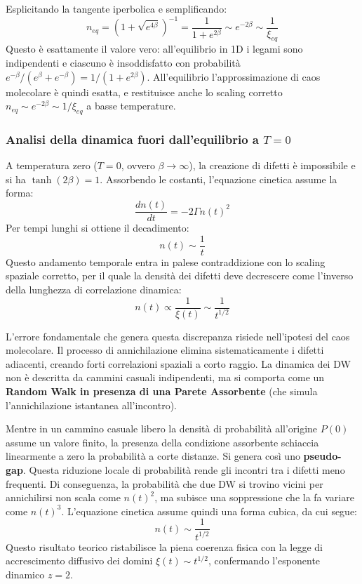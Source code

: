 Esplicitando la tangente iperbolica e semplificando:
\begin{equation}
    n_{eq} = \left( 1 + \sqrt{e^{4\beta}} \right)^{-1} = \frac{1}{1 + e^{2\beta}} \sim e^{-2\beta} \sim \frac{1}{\xi_{eq}}
\end{equation}
Questo è esattamente il valore vero: all'equilibrio in 1D i legami sono indipendenti e ciascuno è insoddisfatto con probabilità $e^{-\beta}/(e^{\beta}+e^{-\beta}) = 1/(1+e^{2\beta})$. All'equilibrio l'approssimazione di caos molecolare è quindi esatta, e restituisce anche lo scaling corretto $n_{eq} \sim e^{-2\beta} \sim 1/\xi_{eq}$ a basse temperature.

\subsubsection*{Analisi della dinamica fuori dall'equilibrio a $T=0$}
A temperatura zero ($T = 0$, ovvero $\beta \to \infty$), la creazione di difetti è impossibile e si ha $\tanh(2\beta) = 1$. 
Assorbendo le costanti, l'equazione cinetica assume la forma:
\begin{equation}
    \frac{dn(t)}{dt} = -2\Gamma n(t)^2
\end{equation}
Per tempi lunghi si ottiene il decadimento:
\begin{equation}
    n(t) \sim \frac{1}{t}
\end{equation}
Questo andamento temporale entra in palese contraddizione con lo scaling spaziale corretto, per il quale la densità dei difetti deve decrescere come l'inverso della lunghezza di correlazione dinamica:
\begin{equation}
    n(t) \propto \frac{1}{\xi(t)} \sim \frac{1}{t^{1/2}}
\end{equation}

\vspace{0.3cm}

\noindent L'errore fondamentale che genera questa discrepanza risiede nell'ipotesi del caos molecolare. Il processo di annichilazione elimina sistematicamente i difetti adiacenti, creando forti correlazioni spaziali a corto raggio. La dinamica dei DW non è descritta da cammini casuali indipendenti, ma si comporta come un \textbf{Random Walk in presenza di una Parete Assorbente} (che simula l'annichilazione istantanea all'incontro). 

Mentre in un cammino casuale libero la densità di probabilità all'origine $P(0)$ assume un valore finito, la presenza della condizione assorbente schiaccia linearmente a zero la probabilità a corte distanze. Si genera così uno \textbf{pseudo-gap}.
Questa riduzione locale di probabilità rende gli incontri tra i difetti meno frequenti. Di conseguenza, la probabilità che due DW si trovino vicini per annichilirsi non scala come $n(t)^2$, ma subisce una soppressione che la fa variare come $n(t)^3$.
L'equazione cinetica assume quindi una forma cubica, da cui segue:
\begin{equation}
     n(t) \sim \frac{1}{t^{1/2}}
\end{equation}
Questo risultato teorico ristabilisce la piena coerenza fisica con la legge di accrescimento diffusivo dei domini $\xi(t) \sim t^{1/2}$, confermando l'esponente dinamico $z=2$.

